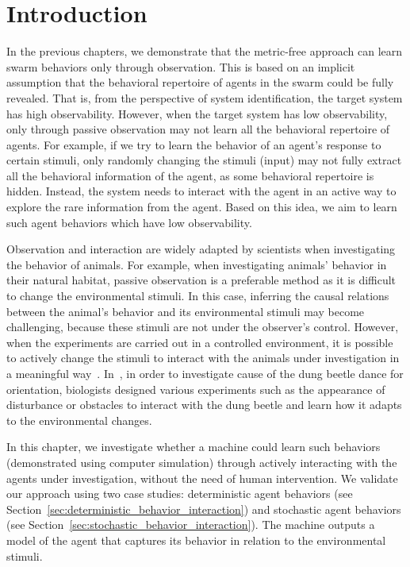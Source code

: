 \section{Introduction}\label{sec:introduction_interaction}

In the previous chapters, we demonstrate that the metric-free approach can learn swarm behaviors only through observation. This is based on an implicit assumption that the behavioral repertoire of agents in the swarm could be fully revealed. That is, from the perspective of system identification, the target system has high observability. However, when the target system has low observability, only through passive observation may not learn all the behavioral repertoire of agents. For example, if we try to learn the behavior of an agent's response to certain stimuli, only randomly changing the stimuli (input) may not fully extract all the behavioral information of the agent, as some behavioral repertoire is hidden. Instead, the system needs to interact with the agent in an active way to explore the rare information from the agent. Based on this idea, we aim to learn such agent behaviors which have low observability. 

Observation and interaction are widely adapted by scientists when investigating the behavior of animals. For example, when investigating animals' behavior in their natural habitat, passive observation is a preferable method as it is difficult to change the environmental stimuli. In this case, inferring the causal relations between the animal's behavior and its environmental stimuli may become challenging, because these stimuli are not under the observer's control. However, when the experiments are carried out in a controlled environment, it is possible to actively change the stimuli to interact with the animals under investigation in a meaningful way~\cite{Martin_1983, Dacke2004, Emily2012}. In~\cite{Emily2012}, in order to investigate cause of the dung beetle dance for orientation, biologists designed various experiments such as the appearance of disturbance or obstacles to interact with the dung beetle and learn how it adapts to the environmental changes. 

In this chapter, we investigate whether a machine could learn such behaviors (demonstrated using computer simulation) through actively interacting with the agents under investigation, without the need of human intervention. We validate our approach using two case studies: deterministic agent behaviors (see Section~\ref{sec:deterministic_behavior_interaction}) and stochastic agent behaviors (see Section~\ref{sec:stochastic_behavior_interaction}). The machine outputs a model of the agent that captures its behavior in relation to the environmental stimuli. 

